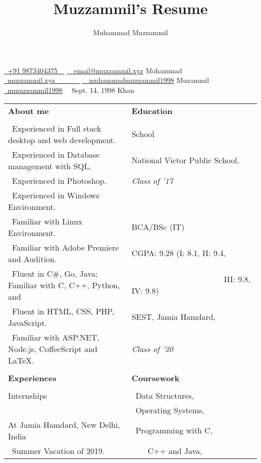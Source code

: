 \documentclass[12pt, a4paper]{article}
\title{Muzzammil's Resume}
\author{Muhammad Muzzammil}
\def\icon#1{\color{icon}{#1}\color{text}}
\def\phone{\icon{\FA \faPhone}}
\def\email{\icon{\FA \faEnvelope0}}
\def\website{\icon{\FA \faGlobe}}
\def\github{\icon{\FA \faGithub}}
\def\twitter{\icon{\FA \faTwitter}}
\def\bday{\icon{\FA \faBirthdayCake}}
\def\p#1{\textbullet \ #1}
\def\heading#1{\color{heading}\Large \bfseries #1 \normalsize \normalfont }
\def\subheading#1{\color{subheading}\large #1 \normalsize \dotfill}
\def\name#1{\Huge #1 \normalsize \\}
\begin{document}
    \noindent
    \href{tel:+91 9873404375}{ \phone\ +91 9873404375\ \ }
    \href{mailto:email@muzzammil.xyz}{ \email \ \ email@muzzammil.xyz} 
    \hfill
    \name{Mohammad}
    \href{https://muzzammil.xyz}{ \website\ muzzammil.xyz\ \ \ \ \ \ \ }
    \href{https://git.muzzammil.xyz/?ref=resume}{ \github\ \ muhammadmuzzammil1998} 
    \hfill 
    \name{Muzammil}
    \href{https://twitter.com/mmuzzammil1998}{ \twitter\ mmuzzammil1998}
    { \bday\ \ Sept. 14, 1998}
    \hfill 
    \name{Khan}
    \begin{center}
        \dotfill
    \end{center}
    \noindent
    \begin{tabular}{l l}
        \heading{About me} & \heading{Education} \\
         &  \\
        \p{Experienced in Full stack desktop and web development.} & \subheading{School} \\
        \p{Experienced in Database management with SQL.} & National Victor Public School, \\
        \p{Experienced in Photoshop.} & \itshape Class of '17 \\
        \p{Experienced in Windows Environment.} &  \\
        \p{Familiar with Linux Environment.} & \subheading{BCA/BSc (IT)} \\
        \p{Familiar with Adobe Premiere and Audition.} & CGPA: 9.28 (I: 8.1, II: 9.4, \\
        \p{Fluent in C\#, Go, Java; Familiar with C, C++, Python, and} & \ \ \ \ \ \ \ \ \ \ \ \ \ \ \ \ \ \ \ \ \ \ \  III: 9.8, IV: 9.8) \\
        \p{Fluent in HTML, CSS, PHP, JavaScript.} & SEST, Jamia Hamdard, \\
        \p{Familiar with ASP.NET, Node.js, CoffeeScript and \LaTeX.} & \itshape Class of '20 \\
         &  \\
        \heading{Experiences} & \heading{Coursework} \\
         &  \\
        \subheading{Internships} & \p{Data Structures}, \\
         & \p{Operating Systems},  \\
        At Jamia Hamdard, New Delhi, India & \p{Programming with C,} \\
        \p{Summer Vacation of 2019.} & \ \ \ \ C++ and Java,  \\

\end{tabular}
\end{document}
